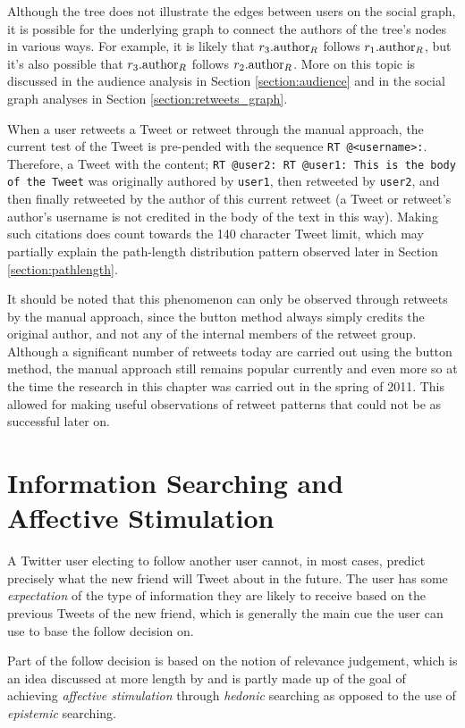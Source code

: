 Although the tree does not illustrate the edges between users on the social graph, it is possible for the underlying graph to connect the authors of the tree's nodes in various ways. For example, it is likely that $r_3.\textrm{author}_R$ follows $r_1.\textrm{author}_R$, but it's also possible that $r_3.\textrm{author}_R$ follows $r_2.\textrm{author}_R$. More on this topic is discussed in the audience analysis in Section \ref{section:audience} and in the social graph analyses in Section  \ref{section:retweets_graph}.

When a user retweets a Tweet or retweet through the manual approach, the current test of the Tweet is pre-pended with the sequence \texttt{RT @<username>:}. Therefore, a Tweet with the content;\newline
\texttt{RT @user2: RT @user1: This is the body of the Tweet}\newline
was originally authored by \texttt{user1}, then retweeted by \texttt{user2}, and then finally retweeted by the author of this current retweet (a Tweet or retweet's author's username is not credited in the body of the text in this way). Making such citations does count towards the 140 character Tweet limit, which may partially explain the path-length distribution pattern observed later in Section \ref{section:pathlength}.

It should be noted that this phenomenon can only be observed through retweets by the manual approach, since the button method always simply credits the original author, and not any of the internal members of the retweet group. Although a significant number of retweets today are carried out using the button method, the manual approach still remains popular currently and even more so at the time the research in this chapter was carried out in the spring of 2011. This allowed for making useful observations of retweet patterns that could not be as successful later on.


\section{Information Searching and Affective Stimulation}
A Twitter user electing to follow another user cannot, in most cases, predict precisely what the new friend will Tweet about in the future. The user has some \textit{expectation} of the type of information they are likely to receive based on the previous Tweets of the new friend, which is generally the main cue the user can use to base the follow decision on.

Part of the follow decision is based on the notion of relevance judgement, which is an idea discussed at more length by \citet{xu07} and is partly made up of the goal of achieving \textit{affective stimulation} through \textit{hedonic} searching as opposed to the use of \textit{epistemic} searching.

